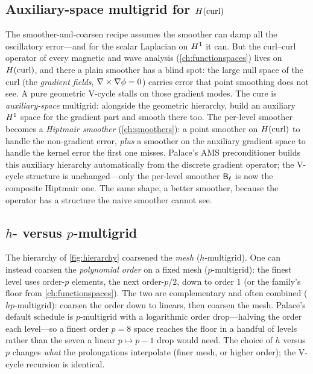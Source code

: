 \subsection{Auxiliary-space multigrid for $H(\mathrm{curl})$}

The smoother-and-coarsen recipe assumes the smoother can damp all the oscillatory error---and
for the scalar Laplacian on $H^1$ it can. But the curl--curl operator of every magnetic and
wave analysis (\cref{ch:functionspaces}) lives on $H(\mathrm{curl})$, and there a plain smoother has a
blind spot: the large null space of the curl (the \emph{gradient fields}, $\nabla\times\nabla\phi =
0$) carries error that point smoothing does not see. A pure geometric V-cycle stalls on those
gradient modes. The cure is \emph{auxiliary-space} multigrid: alongside the geometric
hierarchy, build an auxiliary $H^1$ space for the gradient part and smooth there too. The
per-level smoother becomes a \emph{Hiptmair smoother} (\cref{ch:smoothers}): a point smoother
on $H(\mathrm{curl})$ to handle the non-gradient error, \emph{plus} a smoother on the auxiliary
gradient space to handle the kernel error the first one misses. Palace's AMS preconditioner
builds this auxiliary hierarchy automatically from the discrete gradient operator; the V-cycle
structure is unchanged---only the per-level smoother $\mathsf{B}_\ell$ is now the composite
Hiptmair one. The same shape, a better smoother, because the operator has a structure the
naive smoother cannot see.

\subsection{$h$- versus $p$-multigrid}

The hierarchy of \cref{fig:hierarchy} coarsened the \emph{mesh} ($h$-multigrid). One can
instead coarsen the \emph{polynomial order} on a fixed mesh ($p$-multigrid): the finest level
uses order-$p$ elements, the next order-$p/2$, down to order $1$ (or the family's floor from
\cref{ch:functionspaces}). The two are complementary and often combined ($hp$-multigrid):
coarsen the order down to linears, then coarsen the mesh. Palace's default schedule is
$p$-multigrid with a logarithmic order drop---halving the order each level---so a finest order
$p=8$ space reaches the floor in a handful of levels rather than the seven a linear
$p\mapsto p-1$ drop would need. The choice of $h$ versus $p$ changes \emph{what} the
prolongations interpolate (finer mesh, or higher order); the V-cycle recursion is identical.

